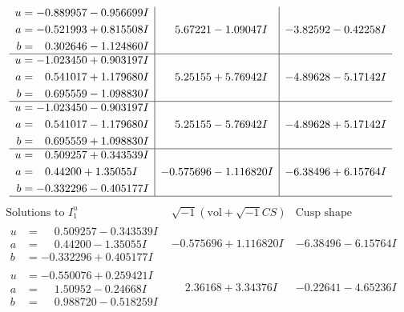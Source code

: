 \documentclass[1p]{elsarticle_modified}
\theoremstyle{definition}
\newcommand{\I}{\sqrt{-1}}
\begin{document}
$$\begin{array}{c|c|c}
\begin{aligned}
u &= -0.889957 - 0.956699 I \\
a &= -0.521993 + 0.815508 I \\
b &= \phantom{-}0.302646 - 1.124860 I\end{aligned}
 & \phantom{-}5.67221 - 1.09047 I & -3.82592 - 0.42258 I \\ \hline\begin{aligned}
u &= -1.023450 + 0.903197 I \\
a &= \phantom{-}0.541017 + 1.179680 I \\
b &= \phantom{-}0.695559 - 1.098830 I\end{aligned}
 & \phantom{-}5.25155 + 5.76942 I & -4.89628 - 5.17142 I \\ \hline\begin{aligned}
u &= -1.023450 - 0.903197 I \\
a &= \phantom{-}0.541017 - 1.179680 I \\
b &= \phantom{-}0.695559 + 1.098830 I\end{aligned}
 & \phantom{-}5.25155 - 5.76942 I & -4.89628 + 5.17142 I \\ \hline\begin{aligned}
u &= \phantom{-}0.509257 + 0.343539 I \\
a &= \phantom{-}0.44200 + 1.35055 I \\
b &= -0.332296 - 0.405177 I\end{aligned}
 & -0.575696 - 1.116820 I & -6.38496 + 6.15764 I\\
 \hline 
 \end{array}$$\newpage$$\begin{array}{c|c|c}  
\text{Solutions to }I^u_{1}& \I (\text{vol} + \sqrt{-1}CS) & \text{Cusp shape}\\
 \hline 
\begin{aligned}
u &= \phantom{-}0.509257 - 0.343539 I \\
a &= \phantom{-}0.44200 - 1.35055 I \\
b &= -0.332296 + 0.405177 I\end{aligned}
 & -0.575696 + 1.116820 I & -6.38496 - 6.15764 I \\ \hline\begin{aligned}
u &= -0.550076 + 0.259421 I \\
a &= \phantom{-}1.50952 - 0.24668 I \\
b &= \phantom{-}0.988720 - 0.518259 I\end{aligned}
 & \phantom{-}2.36168 + 3.34376 I & -0.22641 - 4.65236 I \\ \hline\begin{aligned}

\end{aligned}
\end{array}$$
\end{document}

